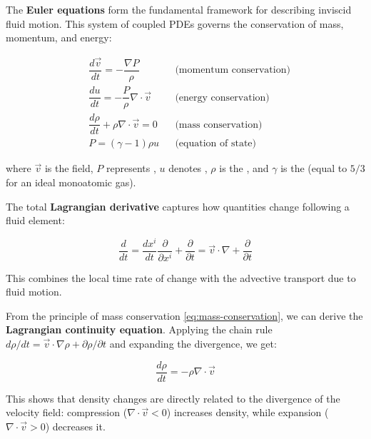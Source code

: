 \medskip

The \textbf{Euler equations} form the fundamental framework for describing inviscid fluid motion. This system of coupled PDEs governs the conservation of mass, momentum, and energy:

\begin{align}
    & \dfrac{d\vec{v}}{dt} = - \dfrac{\nabla P}{\rho} && \text{(momentum conservation)} \tag{1}\label{eq:momentum-conservation}\\[0.6em]
    & \dfrac{du}{dt} = - \dfrac{P}{\rho} \nabla \cdot \vec{v} && \text{(energy conservation)} \tag{2}\label{eq:energy-conservation}\\[0.6em]
    & \dfrac{d\rho}{dt} + \rho \nabla \cdot \vec{v} = 0 && \text{(mass conservation)} \tag{3}\label{eq:mass-conservation}\\[0.8em]
    & P = (\gamma - 1) \rho u && \text{(equation of state)} \tag{4}\label{eq:equation-of-state}
\end{align}

where $\vec{v}$ is the  field, $P$ represents , $u$ denotes , $\rho$ is the , and $\gamma$ is the  (equal to $5/3$ for an ideal monoatomic gas).

\medskip

The total \textbf{Lagrangian derivative} captures how quantities change following a fluid element:

$$
\dfrac{d}{dt} = \dfrac{dx^i}{dt} \dfrac{\partial}{\partial x^i} + \dfrac{\partial}{\partial t} = \vec v \cdot \nabla + \dfrac{\partial}{\partial t}
$$

This combines the local time rate of change with the advective transport due to fluid motion.

\medskip

From the principle of mass conservation \eqref{eq:mass-conservation}, we can derive the \textbf{Lagrangian continuity equation}. Applying the chain rule $d\rho/dt = \vec v \cdot \nabla \rho + \partial \rho / \partial t$ and expanding the divergence, we get:

$$
\dfrac{d\rho}{dt} = - \rho \nabla \cdot \vec{v}
$$

This shows that density changes are directly related to the divergence of the velocity field: compression ($\nabla \cdot \vec{v} < 0$) increases density, while expansion ($\nabla \cdot \vec{v} > 0$) decreases it.

\medskip

